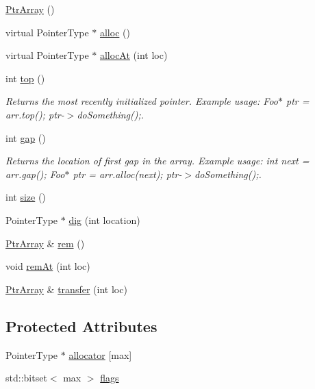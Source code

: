 \begin{DoxyCompactItemize}
\item 
\hyperlink{classTurnLeft_1_1Utils_1_1PtrArray_a8670412ddd365845f034ec999e87efe7}{PtrArray} ()
\item 
virtual PointerType $\ast$ \hyperlink{classTurnLeft_1_1Utils_1_1PtrArray_aef344fc6ecf86d29b6c6ab7947d16bfb}{alloc} ()
\item 
virtual PointerType $\ast$ \hyperlink{classTurnLeft_1_1Utils_1_1PtrArray_aaa6a0e04edfdf8c7c9d431b1a3e9c92f}{allocAt} (int loc)
\item 
int \hyperlink{classTurnLeft_1_1Utils_1_1PtrArray_a6f86a6ff7f98703201eac37497c5fd16}{top} ()
\begin{DoxyCompactList}\small\item\em Returns the most recently initialized pointer. Example usage: Foo$\ast$ ptr = arr.top(); ptr-\/$>$doSomething();. \item\end{DoxyCompactList}\item 
int \hyperlink{classTurnLeft_1_1Utils_1_1PtrArray_a97afb5c3ce5b22060337e41e5d2c49cd}{gap} ()
\begin{DoxyCompactList}\small\item\em Returns the location of first gap in the array. Example usage: int next = arr.gap(); Foo$\ast$ ptr = arr.alloc(next); ptr-\/$>$doSomething();. \item\end{DoxyCompactList}\item 
int \hyperlink{classTurnLeft_1_1Utils_1_1PtrArray_a540d3765bfc55fd34793625b56149583}{size} ()
\item 
PointerType $\ast$ \hyperlink{classTurnLeft_1_1Utils_1_1PtrArray_a415bf117c63ead5703beeb0e73f1e65b}{dig} (int location)
\item 
\hyperlink{classTurnLeft_1_1Utils_1_1PtrArray}{PtrArray} \& \hyperlink{classTurnLeft_1_1Utils_1_1PtrArray_a8664b0d9a6bd1588452961c874af92d8}{rem} ()
\item 
void \hyperlink{classTurnLeft_1_1Utils_1_1PtrArray_aac5d7c50179cdfd02bd47b89a3bc4e26}{remAt} (int loc)
\item 
\hyperlink{classTurnLeft_1_1Utils_1_1PtrArray}{PtrArray} \& \hyperlink{classTurnLeft_1_1Utils_1_1PtrArray_a18c6f0b203495ec27f17253d730cdcac}{transfer} (int loc)
\end{DoxyCompactItemize}
\subsection*{Protected Attributes}
\begin{DoxyCompactItemize}
\item 
PointerType $\ast$ \hyperlink{classTurnLeft_1_1Utils_1_1PtrArray_afd0b2ddd5366a840347a2a7bf22e806e}{allocator} \mbox{[}max\mbox{]}
\item 
std::bitset$<$ max $>$ \hyperlink{classTurnLeft_1_1Utils_1_1PtrArray_ade5460384048e16db12162996bd074cf}{flags}
\end{DoxyCompactItemize}


